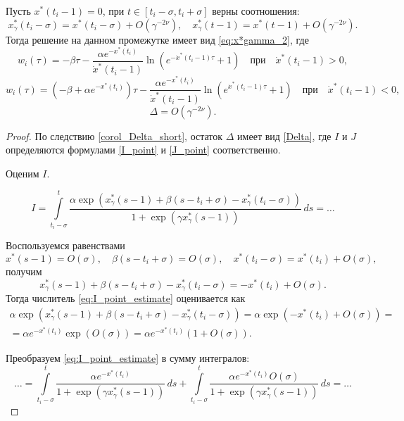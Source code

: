 \begin{lemma}
\label{lm:w}
	Пусть $x^*(t_i - 1) = 0$, при $t \in [t_i - \sigma, t_i + \sigma]$ верны соотношения:
	\[ x^*_{\gamma}(t_i - \sigma) = x^*(t_i - \sigma) + O(\gamma^{-2\nu}), \quad x^*_{\gamma}(t - 1) = x^*(t - 1) + O(\gamma^{-2\nu}).\]
	Тогда решение на данном промежутке имеет вид \eqref{eq:x*gamma_2}, где
	\[
	w_i(\tau) = -\beta \tau - \dfrac{\alpha e^{-x^*(t_i)}}{\dot{x}^*(t_i - 1)} \ln\left(e^{-\dot{x}^*(t_i - 1)\tau} + 1\right) \quad \text{при} \quad \dot{x}^*(t_i - 1) > 0,
	\]
	\[
	w_i(\tau) = (-\beta + \alpha e^{-x^*(t_i)})\tau - \dfrac{\alpha e^{-x^*(t_i)}}{\dot{x}^*(t_i - 1)} \ln\left(e^{\dot{x}^*(t_i - 1)\tau} + 1\right) \quad \text{при} \quad \dot{x}^*(t_i - 1) < 0,
	\]
	\[
	\Delta = O(\gamma^{-2\nu}).
	\]
\end{lemma}
%
\begin{proof}
	По следствию \ref{corol_Delta_short}, остаток $\Delta$ имеет вид \eqref{Delta}, где $I$ и $J$ определяются формулами \eqref{I_point} и \eqref{J_point} соответственно.
	
	Оценим $I$.
	
	\begin{equation}
	\label{eq:I_point_estimate}
	I = \int\limits_{t_i - \sigma}^{t} \dfrac{\alpha \exp(x^*_{\gamma}(s - 1) + \beta(s - t_i + \sigma) - x^*_{\gamma}(t_i - \sigma))}{1 + \exp(\gamma x^*_{\gamma}(s - 1))}\, ds = \ldots
	\end{equation}
	
	Воспользуемся равенствами
	\[
	x^*(s - 1) = O(\sigma), \quad \beta(s - t_i + \sigma) = O(\sigma), \quad x^*(t_i - \sigma) = x^*(t_i) + O(\sigma),
	\]
	получим
	\[
	x^*_{\gamma}(s - 1) + \beta(s - t_i + \sigma) - x^*_{\gamma}(t_i - \sigma) = -x^*(t_i) + O(\sigma).
	\]
	Тогда числитель \eqref{eq:I_point_estimate} оценивается как
	\begin{multline*}
	\alpha \exp(x^*_{\gamma}(s - 1) + \beta(s - t_i + \sigma) - x^*_{\gamma}(t_i - \sigma)) = \alpha \exp(-x^*(t_i) + O(\sigma)) =\\= \alpha e^{-x^*(t_i)} \exp(O(\sigma)) = \alpha e^{-x^*(t_i)} (1 + O(\sigma)).
	\end{multline*}
	
	Преобразуем \eqref{eq:I_point_estimate} в сумму интегралов:
	\[
	\ldots = \int\limits_{t_i - \sigma}^{t} \dfrac{\alpha e^{-x^*(t_i)}}{1 + \exp(\gamma x^*_{\gamma}(s - 1))}\, ds + \int\limits_{t_i - \sigma}^{t} \dfrac{\alpha e^{-x^*(t_i)} O(\sigma)}{1 + \exp(\gamma x^*_{\gamma}(s - 1))} \, ds = \ldots
	\]
	

\end{proof}
